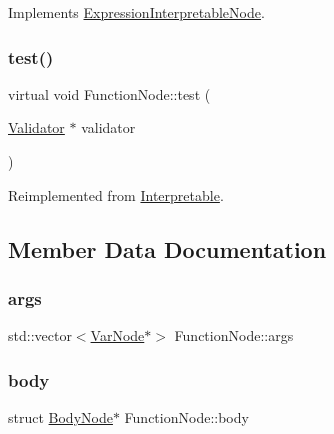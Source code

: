 Implements \hyperlink{classExpressionInterpretableNode_a43650f046c48fc539f77a207e3c9181e}{Expression\+Interpretable\+Node}.

\mbox{\label{classFunctionNode_a1f020e7ea0181b3ce16ad2ef8426f773}} 
\subsubsection{\texorpdfstring{test()}{test()}}
{\footnotesize\ttfamily virtual void Function\+Node\+::test (\begin{DoxyParamCaption}\item[{\hyperlink{classValidator}{Validator} $\ast$}]{validator }\end{DoxyParamCaption})\hspace{0.3cm}{\ttfamily [virtual]}}



Reimplemented from \hyperlink{classInterpretable_a32f547aaf68dcbab993284d3257ab010}{Interpretable}.



\subsection{Member Data Documentation}
\mbox{\label{classFunctionNode_a04bfceaf29255ffd83195f669b5c37ef}} 
\subsubsection{\texorpdfstring{args}{args}}
{\footnotesize\ttfamily std\+::vector$<$\hyperlink{classVarNode}{Var\+Node}$\ast$$>$ Function\+Node\+::args}

\mbox{\label{classFunctionNode_a3ebe1489837aee643b7e9f626ef0976a}} 
\subsubsection{\texorpdfstring{body}{body}}
{\footnotesize\ttfamily struct \hyperlink{classBodyNode}{Body\+Node}$\ast$ Function\+Node\+::body}

